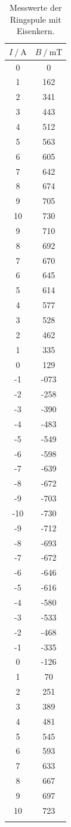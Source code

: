 \begin{table}
\centering
\caption{Messwerte der Ringspule mit Eisenkern.}
\begin{tabular}{cc}
\toprule
$I \:/\: \si{\ampere}$ & $B \:/\: \si{\milli\tesla}$ \\
\midrule
0& 0\\
1& 162  \\
2& 341\\
3& 443\\
4& 512\\
5& 563\\
6& 605\\
7& 642\\
8& 674\\
9& 705\\
10& 730\\
9& 710\\
8& 692\\
7& 670\\
6& 645\\
5& 614\\
4& 577\\
3& 528\\
2& 462\\
1& 335\\
0& 129\\
-1& -073\\
-2& -258\\
-3& -390\\
-4& -483\\
-5& -549\\
-6& -598\\
-7& -639\\
-8& -672\\
-9& -703\\
-10& -730\\
-9& -712\\
-8& -693\\
-7& -672\\
-6& -646\\
-5& -616\\
-4& -580\\
-3& -533\\
-2& -468\\
-1& -335\\
0& -126\\
1& 70\\
2& 251\\
3& 389\\
4& 481\\
5& 545\\
6& 593\\
7& 633\\
8& 667\\
9& 697\\
10& 723\\
\bottomrule
\label{tab:ring}
\end{tabular}
\end{table}

